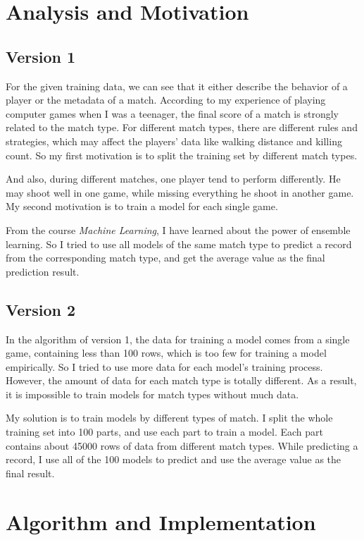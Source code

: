 \documentclass[journal=jacsat,manuscript=article]{achemso}
\begin{document}
\section{Analysis and Motivation}

\subsection{Version 1}

For the given training data, we can see that it either describe the behavior of a player
or the metadata of a match. According to my experience of playing computer games when I
was a teenager, the final score of a match is strongly related to the match type.
For different match types, there are different rules and strategies, which may affect the
players' data like walking distance and killing count. So my first motivation is to
split the training set by different match types.

And also, during different matches, one player tend to perform differently. He may shoot
well in one game, while missing everything he shoot in another game. My second motivation
is to train a model for each single game.

From the course \emph{Machine Learning}, I have learned about the power of ensemble learning.
So I tried to use all models of the same match type to predict a record from the corresponding
match type, and get the average value as the final prediction result.

\subsection{Version 2}

In the algorithm of version 1, the data for training a model comes from a single game,
containing less than 100 rows, which is too few for training a model empirically.
So I tried to use more data for each model's training process. However, the amount of
data for each match type is totally different. As a result, it is impossible to train models
for match types without much data.

My solution is to train models by different types of match. I split the whole training
set into 100 parts, and use each part to train a model. Each part contains about 45000 rows
of data from different match types. While predicting a record, I 
use all of the 100 models to predict and use the average value as the final result.

\section{Algorithm and Implementation}
\end{document}
